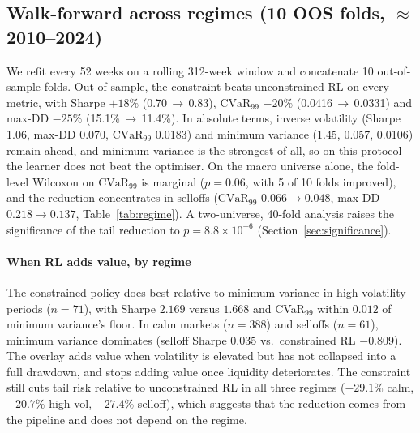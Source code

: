 \documentclass[sigconf]{acmart}
\begin{document}
\subsection{Walk-forward across regimes (10 OOS folds, \texorpdfstring{$\approx$}{about }2010--2024)}
We refit every 52 weeks on a rolling 312-week window and concatenate 10 out-of-sample
folds. Out of sample, the constraint beats unconstrained RL on every metric, with Sharpe $+18\%$
(0.70\,$\to$\,0.83), $\mathrm{CVaR}_{99}$ $-20\%$ (0.0416\,$\to$\,0.0331) and max-DD $-25\%$
(15.1\%\,$\to$\,11.4\%). In absolute terms, inverse volatility (Sharpe 1.06, max-DD 0.070,
$\mathrm{CVaR}_{99}$ 0.0183) and minimum variance (1.45, 0.057, 0.0106) remain ahead, and minimum variance is the
strongest of all, so on this protocol the learner does not beat the
optimiser. On the
macro universe alone, the fold-level Wilcoxon on $\mathrm{CVaR}_{99}$ is marginal ($p=0.06$, with
5 of 10 folds improved), and the reduction concentrates in selloffs ($\mathrm{CVaR}_{99}$
$0.066\!\to\!0.048$, max-DD $0.218\!\to\!0.137$, Table~\ref{tab:regime}). A two-universe, 40-fold analysis raises the significance of the tail reduction to
$p=8.8\times10^{-6}$ (Section~\ref{sec:significance}).

\paragraph{When RL adds value, by regime}
The constrained policy does best relative to minimum variance in high-volatility periods
($n{=}71$), with Sharpe $2.169$ versus $1.668$ and CVaR$_{99}$ within $0.012$ of minimum variance's
floor. In calm markets ($n{=}388$) and selloffs ($n{=}61$), minimum variance dominates (selloff
Sharpe $0.035$ vs.\ constrained RL $-0.809$). The overlay adds value when volatility is
elevated but has not collapsed into a full drawdown, and stops adding value once liquidity
deteriorates. The constraint still cuts tail risk relative to unconstrained RL in all three
regimes ($-29.1\%$ calm, $-20.7\%$ high-vol, $-27.4\%$ selloff), which suggests that the
reduction comes from the pipeline and does not depend on the regime.
\end{document}
